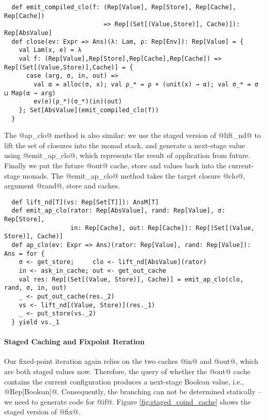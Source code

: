 \begin{lstlisting}
  def emit_compiled_clo(f: (Rep[Value], Rep[Store], Rep[Cache], Rep[Cache])
                           => Rep[(Set[(Value,Store)], Cache)]): Rep[AbsValue]
  def close(ev: Expr => Ans)(λ: Lam, ρ: Rep[Env]): Rep[Value] = {
    val Lam(x, e) = λ
    val f: (Rep[Value],Rep[Store],Rep[Cache],Rep[Cache]) => Rep[(Set[(Value,Store)],Cache)] = {
      case (arg, σ, in, out) =>
        val α = alloc(σ, x); val ρ_* = ρ + (unit(x) → α); val σ_* = σ ⊔ Map(α → arg)
        ev(e)(ρ_*)(σ_*)(in)(out)
    }; Set[AbsValue](emit_compiled_clo(f))
  }
\end{lstlisting}

The @ap_clo@ method is also similar: we use the staged version of @lift_nd@ to
lift the set of closures into the monad stack, and generate a next-stage value
using @emit_ap_clo@, which represents the result of application from future.
Finally we put the future @out@ cache, store and values back into the
current-stage monads. The @emit_ap_clo@ method takes the target closure @clo@,
argument @rand@, store and caches.

\begin{lstlisting}
  def lift_nd[T](vs: Rep[Set[T]]): AnsM[T]
  def emit_ap_clo(rator: Rep[AbsValue], rand: Rep[Value], σ: Rep[Store],
                  in: Rep[Cache], out: Rep[Cache]): Rep[(Set[(Value, Store)], Cache)]
  def ap_clo(ev: Expr => Ans)(rator: Rep[Value], rand: Rep[Value]): Ans = for {
    σ <- get_store;     clo <- lift_nd[AbsValue](rator)
    in <- ask_in_cache; out <- get_out_cache
    val res: Rep[(Set[(Value, Store)], Cache)] = emit_ap_clo(clo, rand, σ, in, out)
    _ <- put_out_cache(res._2)
    vs <- lift_nd[(Value, Store)](res._1)
    _ <- put_store(vs._2)
  } yield vs._1
\end{lstlisting}

\paragraph{Staged Caching and Fixpoint Iteration} 

Our fixed-point iteration again relies on the two caches @in@ and @out@, which are
both staged values now. Therefore, the query of whether the @out@ cache contains
the current configuration produces a next-stage Boolean value, i.e.,
@Rep[Boolean]@. Consequently, the branching can not be determined statically --
we need to generate code for @if@. Figure \ref{fig:staged_coind_cache} shows the
staged version of @fix@.


